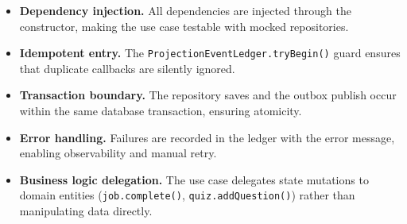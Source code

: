 \begin{itemize}
  \item \textbf{Dependency injection.} All dependencies are injected through the constructor, making the use case testable with mocked repositories.
  \item \textbf{Idempotent entry.} The \texttt{ProjectionEventLedger.tryBegin()} guard ensures that duplicate callbacks are silently ignored.
  \item \textbf{Transaction boundary.} The repository saves and the outbox publish occur within the same database transaction, ensuring atomicity.
  \item \textbf{Error handling.} Failures are recorded in the ledger with the error message, enabling observability and manual retry.
  \item \textbf{Business logic delegation.} The use case delegates state mutations to domain entities (\texttt{job.complete()}, \texttt{quiz.addQuestion()}) rather than manipulating data directly.
\end{itemize}
